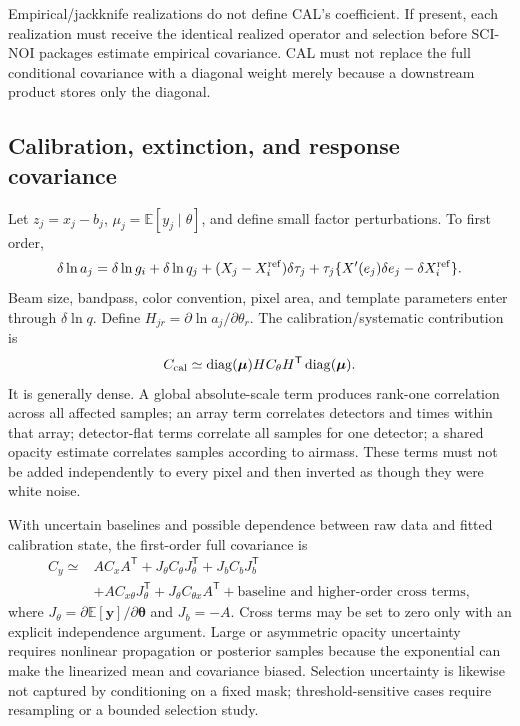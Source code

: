\documentclass[11pt]{article}
\newcommand{\E}{\mathbb{E}}
\newcommand{\diag}{\operatorname{diag}}
\begin{document}
Empirical/jackknife realizations do not define CAL's coefficient.  If present,
each realization must receive the identical realized operator and selection
before SCI-NOI packages estimate empirical covariance.  CAL must not replace
the full conditional covariance with a diagonal weight merely because a
downstream product stores only the diagonal.

\subsection{Calibration, extinction, and response covariance}

Let \(z_j=x_j-b_j\), \(\mu_j=\E[y_j\mid\theta]\), and define small factor
perturbations.  To first order,
\begin{equation}
 \delta\ln a_j = \delta\ln g_i+\delta\ln q_j
 +(X_j-X^{\rm ref}_i)\delta\tau_j
 +\tau_j\{X'(e_j)\delta e_j-\delta X^{\rm ref}_i\}.
 \label{eq:log-factor-perturbation}
\end{equation}
Beam size, bandpass, color convention, pixel area, and template parameters
enter through \(\delta\ln q\).  Define
\(H_{jr}=\partial\ln a_j/\partial\theta_r\).  The calibration/systematic
contribution is
\begin{equation}
 C_{\rm cal}\simeq \diag(\boldsymbol\mu)H C_\theta H^{\mathsf T}
                    \diag(\boldsymbol\mu).
 \label{eq:calibration-covariance}
\end{equation}
It is generally dense.  A global absolute-scale term produces rank-one
correlation across all affected samples; an array term correlates detectors
and times within that array; detector-flat terms correlate all samples for one
detector; a shared opacity estimate correlates samples according to airmass.
These terms must not be added independently to every pixel and then inverted
as though they were white noise.

With uncertain baselines and possible dependence between raw data and fitted
calibration state, the first-order full covariance is
\begin{align}
 C_y \simeq{}& A C_x A^{\mathsf T}
 +J_\theta C_\theta J_\theta^{\mathsf T}
 +J_b C_b J_b^{\mathsf T} \\
 &+A C_{x\theta}J_\theta^{\mathsf T}
 +J_\theta C_{\theta x}A^{\mathsf T}
 +\text{baseline and higher-order cross terms},
 \label{eq:full-covariance}
\end{align}
where \(J_\theta=\partial\E[\boldsymbol y]/\partial\boldsymbol\theta\) and
\(J_b=-A\).  Cross terms may be set to zero only with an explicit independence
argument.  Large or asymmetric opacity uncertainty requires nonlinear
propagation or posterior samples because the exponential can make the
linearized mean and covariance biased.  Selection uncertainty is likewise not
captured by conditioning on a fixed mask; threshold-sensitive cases require
resampling or a bounded selection study.
\end{document}
